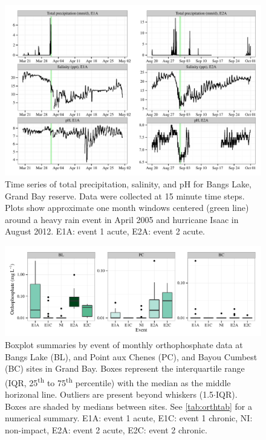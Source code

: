 \documentclass[letterpaper,12pt]{article}\usepackage[]{graphicx}\usepackage[]{color}
\makeatletter
\def\maxwidth{ %
  \ifdim\Gin@nat@width>\linewidth
    \linewidth
  \else
    \Gin@nat@width
  \fi
}
\makeatother
\begin{document}
\begin{figure}[!ht]

{\centering \includegraphics[width=\maxwidth]{figs/tsplotexp-1} 

}

\caption[Time series of total precipitation, salinity, and pH for Bangs Lake, Grand Bay reserve]{Time series of total precipitation, salinity, and pH for Bangs Lake, Grand Bay reserve.  Data were collected at 15 minute time steps.  Plots show approximate one month windows centered (green line) around a heavy rain event in April 2005 and hurricane Isaac in August 2012.  E1A: event 1 acute, E2A: event 2 acute.}\label{fig:tsplotexp}
\end{figure}


\clearpage

\begin{figure}[!ht]

{\centering \includegraphics[width=\maxwidth]{figs/orthfig-1} 

}

\caption{Boxplot summaries by event of monthly orthophosphate data at Bangs Lake (BL), and Point aux Chenes (PC), and Bayou Cumbest (BC) sites in Grand Bay.  Boxes represent the interquartile range (IQR, 25\textsuperscript{th} to 75\textsuperscript{th} percentile) with the median as the middle horizonal line.  Outliers are present beyond whiskers (1.5$\cdot$IQR). Boxes are shaded by medians between sites.  See \cref{tab:orthtab} for a numerical summary. E1A: event 1 acute, E1C: event 1 chronic, NI: non-impact, E2A: event 2 acute, E2C: event 2 chronic.}\label{fig:orthfig}
\end{figure}
\end{document}
